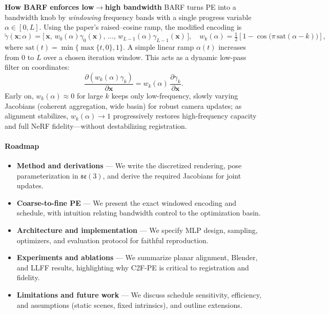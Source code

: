 \begin{enrichment}
\begin{enrichment}
        \textbf{How BARF enforces low}\(\rightarrow\)\textbf{high bandwidth} \;
        BARF turns PE into a bandwidth knob by \emph{windowing} frequency bands with a single progress variable $\alpha\!\in\![0,L]$. Using the paper’s raised–cosine ramp, the modified encoding is
        \[
        \widetilde{\gamma}(\mathbf{x};\alpha)=\big[\,\mathbf{x},\,w_0(\alpha)\gamma_0(\mathbf{x}),\,\ldots,\,w_{L-1}(\alpha)\gamma_{L-1}(\mathbf{x})\,\big],
        \quad
        w_k(\alpha)=\tfrac{1}{2}\!\left[1-\cos\!\big(\pi\,\mathrm{sat}(\alpha-k)\big)\right],
        \]
        where $\mathrm{sat}(t)=\min\{\max\{t,0\},1\}$. A simple linear ramp $\alpha(t)$ increases from $0$ to $L$ over a chosen iteration window. This acts as a dynamic low-pass filter on coordinates:
        \[
        \frac{\partial (w_k(\alpha)\gamma_k)}{\partial \mathbf{x}}
        = w_k(\alpha)\,\frac{\partial \gamma_k}{\partial \mathbf{x}}.
        \]
        Early on, $w_k(\alpha)\!\approx\!0$ for large $k$ keeps only low-frequency, slowly varying Jacobians (coherent aggregation, wide basin) for robust camera updates; as alignment stabilizes, $w_k(\alpha)\!\rightarrow\!1$ progressively restores high-frequency capacity and full NeRF fidelity—without destabilizing registration.
        
        \newpage
        
        \paragraph{Roadmap}
        \begin{itemize}
            \item \textbf{Method and derivations} — We write the discretized rendering, pose parameterization in $\mathfrak{se}(3)$, and derive the required Jacobians for joint updates.
            \item \textbf{Coarse-to-fine PE} — We present the exact windowed encoding and schedule, with intuition relating bandwidth control to the optimization basin.
            \item \textbf{Architecture and implementation} — We specify MLP design, sampling, optimizers, and evaluation protocol for faithful reproduction.
            \item \textbf{Experiments and ablations} — We summarize planar alignment, Blender, and LLFF results, highlighting why C2F-PE is critical to registration and fidelity.
            \item \textbf{Limitations and future work} — We discuss schedule sensitivity, efficiency, and assumptions (static scenes, fixed intrinsics), and outline extensions.
        \end{itemize}
                

\end{enrichment}
\end{enrichment}
